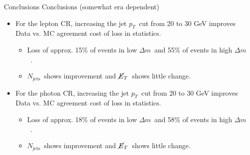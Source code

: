\documentclass[10pt,xcolor=svgnames,fleqn,aspectratio=169]{beamer}
\newcommand{\pt}{$p_{T}$~}
\newcommand{\nj}{$N_\mathrm{jets}$~}
\newcommand{\met}{$\cancel{E}_{T}$~}
\newcommand{\lowdm}{low $\Delta m$~}
\newcommand{\highdm}{high $\Delta m$~}
\begin{document}
\begin{frame}{Conclusions}
Conclusions (somewhat era dependent)
\begin{itemize}
\item For the lepton CR, increasing the jet \pt cut from 20 to 30 GeV improves Data vs. MC agreement cost of loss in statistics.
\begin{itemize}
\item Loss of approx. 15\% of events in \lowdm and 55\% of events in \highdm.
\item \nj shows improvement and \met shows little change.
\end{itemize}
\item For the photon CR, increasing the jet \pt cut from 20 to 30 GeV improves Data vs. MC agreement cost of loss in statistics.
\begin{itemize}
\item Loss of approx. 18\% of events in \lowdm and 58\% of events in \highdm.
\item \nj shows improvement and \met shows little change.
\end{itemize}
\end{itemize}
\end{frame}




\end{document}
